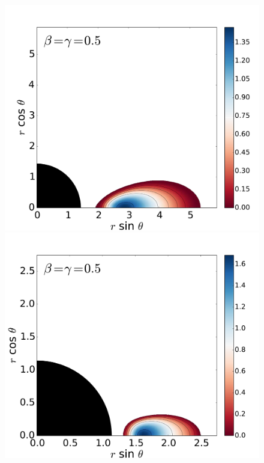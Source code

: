 \documentclass[]{aa}
\begin{document}
\begin{figure}
\includegraphics[scale=0.14]{figures/fig2_2_2.pdf}
\hspace{-0.2cm}
\includegraphics[scale=0.14]{figures/fig2_2_3.pdf}
\\

\end{figure}
\end{document}
